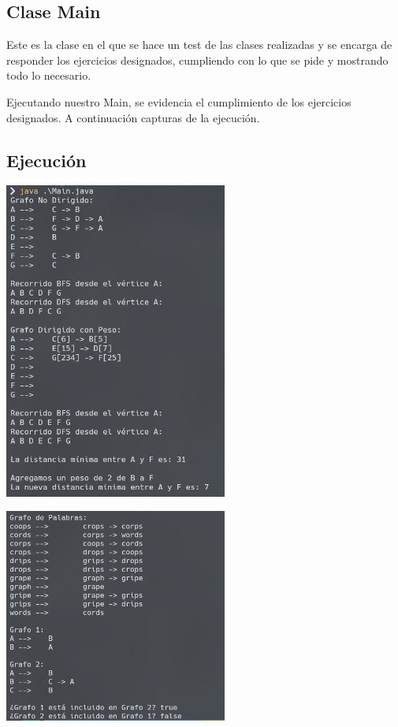 \documentclass{article}
\begin{document}
        \subsection{Clase Main}

            Este es la clase en el que se hace un test de las clases realizadas y se encarga de responder los ejercicios designados, cumpliendo con lo que se pide y mostrando todo lo necesario.
        
            

            Ejecutando nuestro Main, se evidencia el cumplimiento de los ejercicios designados. A continuación capturas de la ejecución.

        \subsection{Ejecución}
            \begin{center}
                \includegraphics[width=0.55\textwidth]{img/cap1.png}
            \end{center}

            \begin{center}
                \includegraphics[width=0.55\textwidth]{img/cap2.png}
            \end{center}
\end{document}
